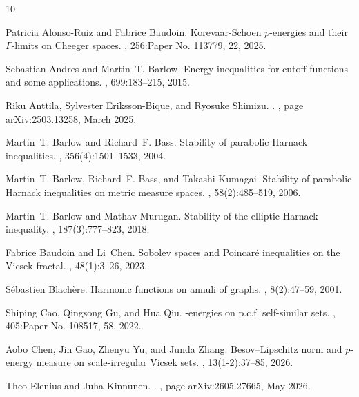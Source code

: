 \documentclass[11pt,a4paper]{article}
\numberwithin{equation}{section}
\theoremstyle{plain}
\theoremstyle{definition}
\begin{document}
\begin{thebibliography}{10}

Patricia Alonso-Ruiz and Fabrice Baudoin.
\newblock Korevaar-{S}choen {$p$}-energies and their {$\Gamma $}-limits on
  {C}heeger spaces.
, 256:Paper No. 113779, 22, 2025.

Sebastian Andres and Martin~T. Barlow.
\newblock Energy inequalities for cutoff functions and some applications.
, 699:183--215, 2015.

Riku {Anttila}, Sylvester {Eriksson-Bique}, and Ryosuke {Shimizu}.
.
, page arXiv:2503.13258, March 2025.

Martin~T. Barlow and Richard~F. Bass.
\newblock Stability of parabolic {H}arnack inequalities.
, 356(4):1501--1533, 2004.

Martin~T. Barlow, Richard~F. Bass, and Takashi Kumagai.
\newblock Stability of parabolic {H}arnack inequalities on metric measure
  spaces.
, 58(2):485--519, 2006.

Martin~T. Barlow and Mathav Murugan.
\newblock Stability of the elliptic {H}arnack inequality.
, 187(3):777--823, 2018.

Fabrice Baudoin and Li~Chen.
\newblock Sobolev spaces and {P}oincar\'e{} inequalities on the {V}icsek
  fractal.
, 48(1):3--26, 2023.

S\'ebastien Blach\`ere.
\newblock Harmonic functions on annuli of graphs.
, 8(2):47--59, 2001.

Shiping Cao, Qingsong Gu, and Hua Qiu.
-energies on p.c.f. self-similar sets.
, 405:Paper No. 108517, 58, 2022.

Aobo Chen, Jin Gao, Zhenyu Yu, and Junda Zhang.
\newblock Besov--{L}ipschitz norm and {$p$}-energy measure on scale-irregular
  {V}icsek sets.
, 13(1-2):37--85, 2026.

Theo {Elenius} and Juha {Kinnunen}.
.
, page arXiv:2605.27665, May 2026.


\end{thebibliography}
\end{document}
